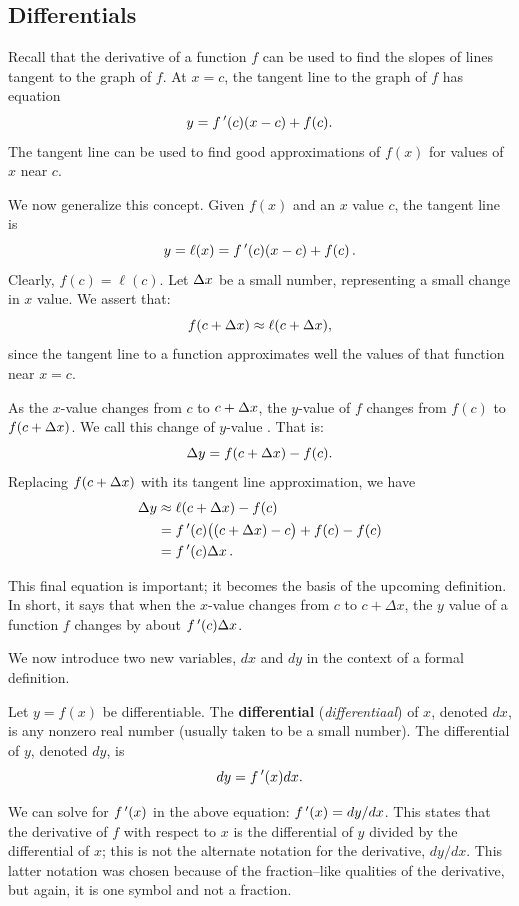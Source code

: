 \fi
\fi

\ifcourse
\subsection{Differentials}\label{sec:differentials}
Recall that the derivative of a function $f$ can be used to find the slopes of lines tangent to the graph of $f$. At $x=c$, the tangent line to the graph of $f$ has equation $$y = f\,'(c)(x-c)+f(c).$$
The tangent line can be used to find good approximations of $f(x)$ for values of $x$ near $c$. 

We now generalize this concept. Given $f(x)$ and an $x$ value $c$,  the tangent line is $$y=\ell(x) = f\,'(c)(x-c)+f(c)\,.$$ Clearly, $f(c) = \ell(c)$. Let $\Delta x$ be a small number, representing a small change in $x$ value. We assert that:
$$f(c+\Delta x) \approx \ell(c+\Delta x),$$ since the tangent line to a function approximates well the values of that function near $x=c$. 

As the $x$-value changes from $c$ to $c+\Delta x$, the $y$-value of $f$ changes from $f(c)$ to $f(c+\Delta x)$. We call this change of $y$-value \dy. That is:
$$\Delta y = f(c+\Delta x)-f(c).$$
Replacing $f(c+\Delta x)$ with its tangent line approximation, we have 
\begin{align} \Delta y &\approx \ell(c+\Delta x) - f(c) \nonumber\\
								&= f\,'(c)\big((c+\Delta x)-c\big)+f(c) - f(c)\nonumber \\
								&=f\,'(c)\Delta x\,.	\label{eq:differential}
\end{align}

This final equation is important; it becomes the basis of the upcoming definition. In short, it says that when the $x$-value changes from $c$ to $c+\Delta x$, the $y$ value of a function $f$ changes by about $f\,'(c)\Delta x$.

We now introduce two new variables, $dx$ and $dy$ in the context of a formal definition.

\begin{definition}\label{def:differential}
Let $y=f(x)$ be differentiable. The \textbf{differential} (\textit{differentiaal}) of $x$, denoted $dx$, is any nonzero real number (usually taken to be a small number). The differential of $y$, denoted $dy$, is $$dy = f\,'(x)dx.$$
\end{definition}


We can solve for $f\,'(x)$ in the above equation: $f\,'(x) = dy/dx$. This states that the derivative of $f$ with respect to $x$ is the differential of $y$ divided by the differential of $x$; this is not the alternate notation for the derivative, $dy/dx$. This latter notation was chosen because of the fraction--like qualities of the derivative, but again, it is one symbol and not a fraction.

